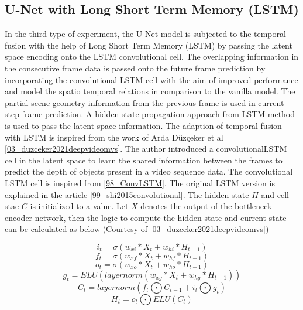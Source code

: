     
    \subsection{U-Net with Long Short Term Memory (LSTM)}
    
    In the third type of experiment, the U-Net model is subjected to the temporal fusion with the help of Long Short Term Memory (LSTM) by passing the latent space encoding onto the LSTM convolutional cell. The overlapping information in the consecutive frame data is passed onto the future frame prediction by incorporating the convolutional LSTM cell with the aim of improved performance and model the spatio temporal relations in comparison to the vanilla model. The partial scene geometry information from the previous frame is used in current step frame prediction. A hidden state propagation approach from LSTM method is used to pass the latent space information. The adaption of temporal fusion with LSTM is inspired from the work of Arda Düzçeker et al \ref{03_duzceker2021deepvideomvs}. The author introduced a convolutionalLSTM cell in the latent space to learn the shared information between the frames to predict the depth of objects present in a video sequence data. The convolutional LSTM cell is inspired from \ref{98_ConvLSTM}. The original LSTM version is explained in the article \ref{99_shi2015convolutional}. The hidden state $H$ and cell stae $C$ is initialized to a value. Let $X$ denotes the output of the bottleneck encoder network, then the logic to compute the hidden state and current state can be calculated as below (Courtesy of \ref{03_duzceker2021deepvideomvs})
    
    \begin{equation}
    	i_t = \sigma(w_{xi}*X_t+w_{hi}*H_{t-1})
    	\label{eq:it}
    \end{equation}
    \begin{equation}
		f_t = \sigma(w_{xf}*X_t+w_{hf}*H_{t-1})
		\label{eq:ft}
	\end{equation}    
    \begin{equation}
	 	o_t = \sigma(w_{xo}*X_t+w_{ho}*H_{t-1})
	 	\label{eq:ot}
 	\end{equation}   
    \begin{equation}
	    g_t = ELU(layernorm(w_{xg}*X_t+w_{hg}*H_{t-1}))
	    \label{eq:gt}
    \end{equation}
    \begin{equation}
	    C_t = layernorm(f_t \bigodot C_{t-1} +i_t \bigodot g_t)
	    \label{eq:Ct}
    \end{equation}
    \begin{equation}
	    H_t = o_t \bigodot ELU(C_t)
	    \label{eq:Ht}
    \end{equation}
    
